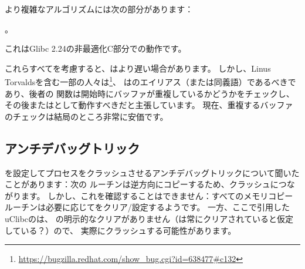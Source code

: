 より複雑なアルゴリズムには次の部分があります：

。

これはGlibc 2.24の非最適化C部分での動作です。

これらすべてを考慮すると、はより遅い場合があります。
しかし、Linus Torvaldsを含む一部の人々は\footnote{\url{https://bugzilla.redhat.com/show_bug.cgi?id=638477\#c132}}、
はのエイリアス（または同義語）であるべきであり、後者の
関数は開始時にバッファが重複しているかどうかをチェックし、その後またはとして動作すべきだと主張しています。
現在、重複するバッファのチェックは結局のところ非常に安価です。

\subsection{アンチデバッグトリック}

を設定してプロセスをクラッシュさせるアンチデバッグトリックについて聞いたことがあります：次の
ルーチンは逆方向にコピーするため、クラッシュにつながります。
しかし、これを確認することはできません：すべてのメモリコピールーチンは必要に応じてをクリア/設定するようです。
一方、ここで引用したuClibcのは、
の明示的なクリアがありません（は常にクリアされていると仮定している？）ので、
実際にクラッシュする可能性があります。